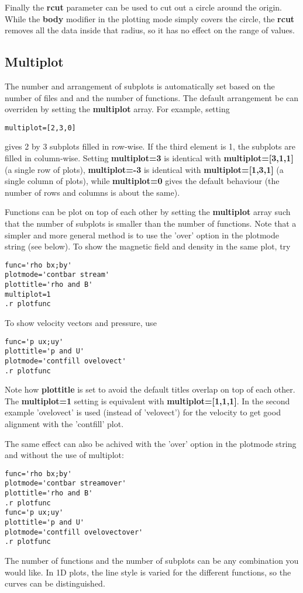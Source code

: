 Finally the {\bf rcut} parameter can be used to cut out a circle around
the origin. While the {\bf body} modifier in the plotting mode simply covers
the circle, the {\bf rcut} removes all the data inside that radius,
so it has no effect on the range of values.

\subsection{Multiplot \label{s-multiplot}}

   The number and arrangement of subplots is automatically set based 
   on the number of files and and the number of functions. 
   The default arrangement be can overriden by setting the
   {\bf multiplot} array. For example, setting 
\begin{verbatim}
multiplot=[2,3,0]
\end{verbatim} 
gives 2 by 3 subplots filled in row-wise. If the third element is 1,
the subplots are filled in column-wise.  Setting {\bf multiplot=3} is
identical with {\bf multiplot=[3,1,1]} (a single row of plots),
{\bf multiplot=-3} is identical with {\bf multiplot=[1,3,1]}
(a single column of plots), while {\bf multiplot=0} gives the default
behaviour (the number of rows and columns is about the same).

   Functions can be plot on top of each other by setting the {\bf multiplot}
   array such that the number of subplots is smaller than the number of
   functions. Note that a simpler and more general method is to use the 'over'
   option in the plotmode string (see below). 
   To show the magnetic field and density in the same plot, try
\begin{verbatim}
func='rho bx;by'
plotmode='contbar stream'
plottitle='rho and B'
multiplot=1
.r plotfunc
\end{verbatim}
   To show velocity vectors and pressure, use
\begin{verbatim}
func='p ux;uy'
plottitle='p and U'
plotmode='contfill ovelovect'
.r plotfunc
\end{verbatim}
   Note how {\bf plottitle} is set to avoid the default titles
   overlap on top of each other. The {\bf multiplot=1} setting
   is equivalent with {\bf multiplot=[1,1,1]}. In the second example
   'ovelovect' is used (instead of 'velovect') for the velocity to get 
   good alignment with the 'contfill' plot. 

   The same effect can also be achived with the 'over' option in the 
   plotmode string and without the use of multiplot:
\begin{verbatim}
func='rho bx;by'
plotmode='contbar streamover'
plottitle='rho and B'
.r plotfunc
func='p ux;uy'
plottitle='p and U'
plotmode='contfill ovelovectover'
.r plotfunc
\end{verbatim}
   The number of functions and the number of subplots can be any combination
   you would like. In 1D plots, the line style is varied for the different 
   functions, so the curves can be distinguished.

